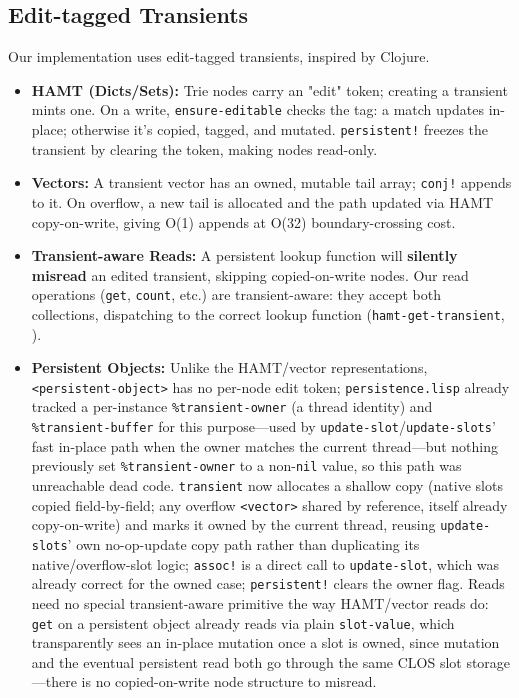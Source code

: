 \documentclass[sigplan,review,anonymous]{acmart}
\begin{document}
\subsection{Edit-tagged Transients}
\label{sec:edittagged}
Our implementation uses edit-tagged transients, inspired by Clojure.
\begin{itemize}
    \item \textbf{HAMT (Dicts/Sets):} Trie nodes carry an "edit" token; creating a transient mints one. On a write, \texttt{ensure-editable} checks the tag: a match updates in-place; otherwise it's copied, tagged, and mutated. \texttt{persistent!} freezes the transient by clearing the token, making nodes read-only.
    \item \textbf{Vectors:} A transient vector has an owned, mutable tail array; \texttt{conj!} appends to it. On overflow, a new tail is allocated and the path updated via HAMT copy-on-write, giving O(1) appends at O(32) boundary-crossing cost.
    \item \textbf{Transient-aware Reads:} A persistent lookup function will \textbf{silently misread} an edited transient, skipping copied-on-write nodes. Our read operations (\texttt{get}, \texttt{count}, etc.) are transient-aware: they accept both collections, dispatching to the correct lookup function (\texttt{hamt-get-transient}, ).
    \item \textbf{Persistent Objects:} Unlike the HAMT/vector representations, \texttt{<persistent-object>} has no per-node edit token; \texttt{persistence.lisp} already tracked a per-instance \texttt{\%transient-owner} (a thread identity) and \texttt{\%transient-buffer} for this purpose---used by \texttt{update-slot}/\texttt{update-slots}' fast in-place path when the owner matches the current thread---but nothing previously set \texttt{\%transient-owner} to a non-\texttt{nil} value, so this path was unreachable dead code. \texttt{transient} now allocates a shallow copy (native slots copied field-by-field; any overflow \texttt{<vector>} shared by reference, itself already copy-on-write) and marks it owned by the current thread, reusing \texttt{update-slots}' own no-op-update copy path rather than duplicating its native/overflow-slot logic; \texttt{assoc!} is a direct call to \texttt{update-slot}, which was already correct for the owned case; \texttt{persistent!} clears the owner flag. Reads need no special transient-aware primitive the way HAMT/vector reads do: \texttt{get} on a persistent object already reads via plain \texttt{slot-value}, which transparently sees an in-place mutation once a slot is owned, since mutation and the eventual persistent read both go through the same CLOS slot storage---there is no copied-on-write node structure to misread.
\end{itemize}
\end{document}
